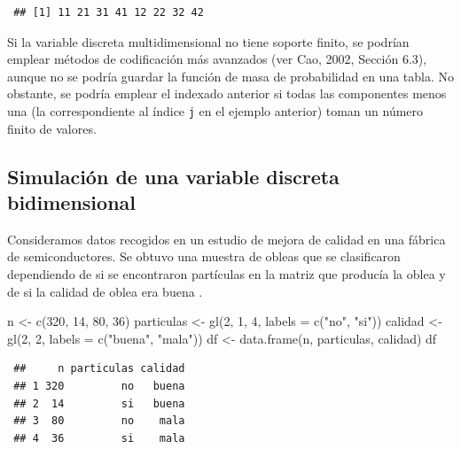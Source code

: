 \documentclass[
  10pt,
]{book}
\newenvironment{Shaded}{\begin{snugshade}}{\end{snugshade}}
\newcommand{\AttributeTok}[1]{\textcolor[rgb]{0.77,0.63,0.00}{#1}}
\newcommand{\DecValTok}[1]{\textcolor[rgb]{0.00,0.00,0.81}{#1}}
\newcommand{\FunctionTok}[1]{\textcolor[rgb]{0.00,0.00,0.00}{#1}}
\newcommand{\NormalTok}[1]{#1}
\newcommand{\OtherTok}[1]{\textcolor[rgb]{0.56,0.35,0.01}{#1}}
\newcommand{\StringTok}[1]{\textcolor[rgb]{0.31,0.60,0.02}{#1}}
\theoremstyle{break}
\theoremstyle{nonumberplain}
\begin{document}
\begin{verbatim}
 ## [1] 11 21 31 41 12 22 32 42
\end{verbatim}

Si la variable discreta multidimensional no tiene soporte finito, se podrían emplear métodos de codificación más avanzados (ver Cao, 2002, Sección 6.3), aunque no se podría guardar la función de masa de probabilidad en una tabla.
No obstante, se podría emplear el indexado anterior si todas las componentes menos una (la correspondiente al índice \texttt{j} en el ejemplo anterior) toman un número finito de valores.

\hypertarget{simulaciuxf3n-de-una-variable-discreta-bidimensional}{%
\subsection{Simulación de una variable discreta bidimensional}\label{simulaciuxf3n-de-una-variable-discreta-bidimensional}}

Consideramos datos recogidos en un estudio de mejora de calidad en una fábrica de semiconductores.
Se obtuvo una muestra de obleas que se clasificaron dependiendo de si se encontraron partículas en la matriz que producía la oblea y de si la calidad de oblea era buena \citep[para más detalles ver][]{hall1994}.

\begin{Shaded}
\begin{Highlighting}[]
\NormalTok{n }\OtherTok{\textless{}{-}} \FunctionTok{c}\NormalTok{(}\DecValTok{320}\NormalTok{, }\DecValTok{14}\NormalTok{, }\DecValTok{80}\NormalTok{, }\DecValTok{36}\NormalTok{)}
\NormalTok{particulas }\OtherTok{\textless{}{-}} \FunctionTok{gl}\NormalTok{(}\DecValTok{2}\NormalTok{, }\DecValTok{1}\NormalTok{, }\DecValTok{4}\NormalTok{, }\AttributeTok{labels =} \FunctionTok{c}\NormalTok{(}\StringTok{"no"}\NormalTok{, }\StringTok{"si"}\NormalTok{))}
\NormalTok{calidad }\OtherTok{\textless{}{-}} \FunctionTok{gl}\NormalTok{(}\DecValTok{2}\NormalTok{, }\DecValTok{2}\NormalTok{, }\AttributeTok{labels =} \FunctionTok{c}\NormalTok{(}\StringTok{"buena"}\NormalTok{, }\StringTok{"mala"}\NormalTok{))}
\NormalTok{df }\OtherTok{\textless{}{-}} \FunctionTok{data.frame}\NormalTok{(n, particulas, calidad)}
\NormalTok{df}
\end{Highlighting}
\end{Shaded}

\begin{verbatim}
 ##     n particulas calidad
 ## 1 320         no   buena
 ## 2  14         si   buena
 ## 3  80         no    mala
 ## 4  36         si    mala
\end{verbatim}
\end{document}
